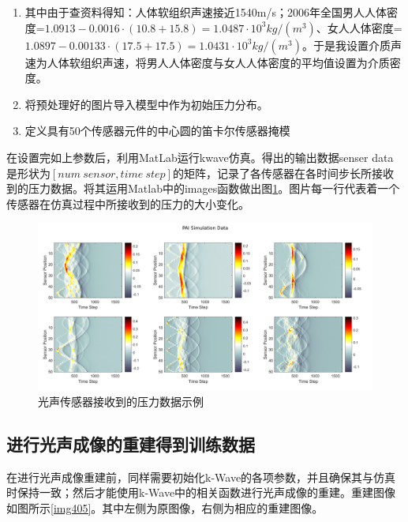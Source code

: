 \begin{enumerate}
	\item 其中由于查资料得知：人体软组织声速接近1540m/s；2006年全国男人人体密度=$1.0913-0.0016\cdot (10.8+15.8)=1.0487\cdot 10^3kg/(m^3)$、女人人体密度=$1.0897-0.00133\cdot (17.5+17.5)=1.0431\cdot 10^3kg/(m^3)$。于是我设置介质声速为人体软组织声速，将男人人体密度与女人人体密度的平均值设置为介质密度。
	\item 将预处理好的图片导入模型中作为初始压力分布。
	\item 定义具有50个传感器元件的中心圆的笛卡尔传感器掩模
\end{enumerate}
在设置完如上参数后，利用MatLab运行kwave仿真。得出的输出数据senser data是形状为$[num\ sensor,time\ step]$的矩阵，记录了各传感器在各时间步长所接收到的压力数据。将其运用Matlab中的images函数做出图\ref{img404}。图片每一行代表着一个传感器在仿真过程中所接收到的压力的大小变化。

\begin{figure}[h]
	\centering
	\includegraphics[width=0.9\columnwidth]{image/chap04/img404.png}
	\caption{光声传感器接收到的压力数据示例}
	\label{img404}
\end{figure}

\subsection{进行光声成像的重建得到训练数据}
在进行光声成像重建前，同样需要初始化k-Wave的各项参数，并且确保其与仿真时保持一致；然后才能使用k-Wave中的相关函数进行光声成像的重建。重建图像如图所示\ref{img405}。其中左侧为原图像，右侧为相应的重建图像。

